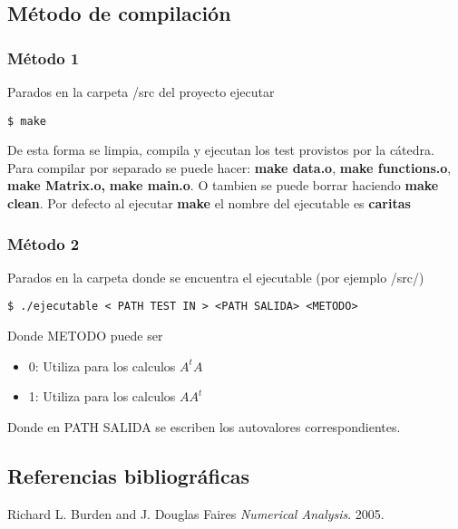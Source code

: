 \subsection{M\'etodo de compilaci\'on}

\subsubsection{M\'etodo 1}
\begin{framed}
Parados en la carpeta /src del proyecto ejecutar 
\begin{verbatim}
$ make
\end{verbatim}
De esta forma se limpia, compila y ejecutan los test provistos por la c\'atedra.
Para compilar por separado se puede hacer:  \textbf{make data.o}, \textbf{make functions.o}, \textbf{make Matrix.o,} \textbf{make main.o}. O tambien se puede borrar haciendo \textbf{make clean}. Por defecto al ejecutar \textbf{make} el nombre del ejecutable es \textbf{caritas}
\end{framed}

\subsubsection{M\'etodo 2}
\begin{framed}
Parados en la carpeta donde se encuentra el ejecutable (por ejemplo /src/) 
\begin{verbatim}
$ ./ejecutable < PATH TEST IN > <PATH SALIDA> <METODO>
\end{verbatim}
Donde METODO puede ser 
\begin{itemize}
	\item 0: Utiliza para los calculos $A^tA$
	\item 1: Utiliza para los calculos $AA^t$
\end{itemize}
Donde en PATH SALIDA se escriben los autovalores correspondientes.
\end{framed}




\subsection{Referencias bibliogr\'aficas}
\begin{thebibliography}{9}

  Richard L. Burden and J. Douglas Faires
  \emph{Numerical Analysis}.
  2005.
\end{thebibliography}
